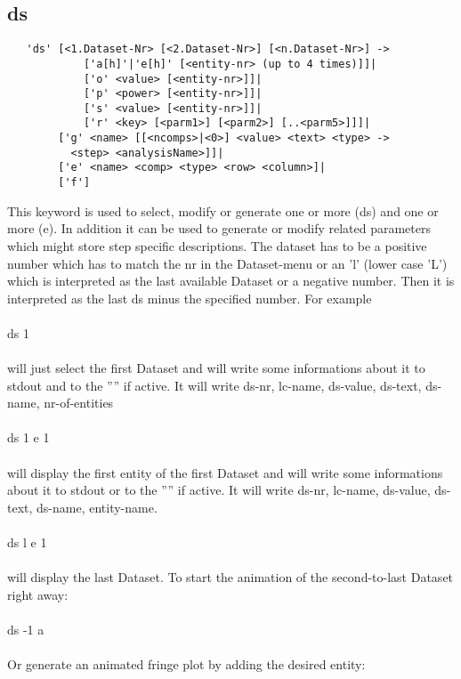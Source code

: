 \documentclass{article}
\begin{document}
\subsection{\label{ds}ds}
\begin{verbatim}
   'ds' [<1.Dataset-Nr> [<2.Dataset-Nr>] [<n.Dataset-Nr>] ->
            ['a[h]'|'e[h]' [<entity-nr> (up to 4 times)]]|
            ['o' <value> [<entity-nr>]]|
            ['p' <power> [<entity-nr>]]|
            ['s' <value> [<entity-nr>]]|
            ['r' <key> [<parm1>] [<parm2>] [..<parm5>]]]|
        ['g' <name> [[<ncomps>|<0>] <value> <text> <type> ->
          <step> <analysisName>]]|
        ['e' <name> <comp> <type> <row> <column>]|
        ['f']
\end{verbatim}
This keyword is used to select, modify or generate one or more  (ds) and one or more  (e). In addition it can be used to generate or modify related parameters which might store step specific descriptions. The dataset has to be a positive number which has to match the nr in the Dataset-menu or an 'l' (lower case 'L') which is interpreted as the last available Dataset or a negative number. Then it is interpreted as the last ds minus the specified number. For example\\\\
ds 1\\\\
will just select the first Dataset and will write some informations about it to stdout and to the '''' if active. It will write ds-nr, lc-name, ds-value, ds-text, ds-name, nr-of-entities \\\\
ds 1 e 1\\\\
will display the first entity of the first Dataset and will write some informations about it to stdout or to the '''' if active. It will write ds-nr, lc-name, ds-value, ds-text, ds-name, entity-name.\\\\
ds l e 1\\\\
will display the last Dataset.
To start the animation of the second-to-last Dataset right away:\\\\
ds -1 a\\\\
Or generate an animated fringe plot by adding the desired entity:\\\\
\end{document}
